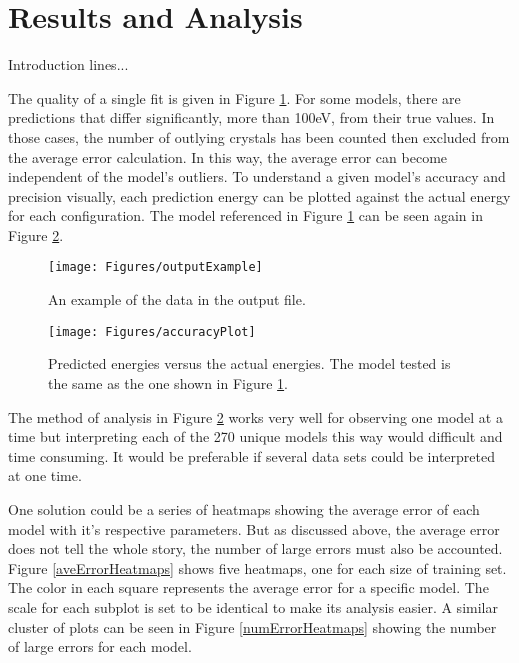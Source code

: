 \section{Results and Analysis}\label{Sect:results}
\par Introduction lines...
\par The quality of a single fit is given in Figure \ref{outputExample}. For some models, there are predictions that differ significantly, more than 100eV, from their true values. In those cases, the number of outlying crystals has been counted then excluded from the average error calculation. In this way, the average error can become independent of the model's outliers. To understand a given model's accuracy and precision visually, each prediction energy can be plotted against the actual energy for each configuration. The model referenced in Figure \ref{outputExample} can be seen again in Figure \ref{accuracyPlot}.

\begin{figure}[h]
\texttt{[image: Figures/outputExample]}
\caption{An example of the data in the output file. 
\label{outputExample}} 
\end{figure}

\begin{figure}[h]
\texttt{[image: Figures/accuracyPlot]}
\caption{Predicted energies versus the actual energies. The model tested is the same as the one shown in Figure \ref{outputExample}.
\label{accuracyPlot}} 
\end{figure}

\par The method of analysis in Figure \ref{accuracyPlot} works very well for observing one model at a time but interpreting each of the 270 unique models this way would difficult and time consuming. It would be preferable if several data sets could be interpreted at one time.
\par One solution could be a series of heatmaps showing the average error of each model with it's respective parameters. But as discussed above, the average error does not tell the whole story, the number of large errors must also be accounted. Figure \ref{aveErrorHeatmaps} shows five heatmaps, one for each size of training set. The color in each square represents the average error for a specific model. The scale for each subplot is set to be identical to make its analysis easier. A similar cluster of plots can be seen in Figure \ref{numErrorHeatmaps} showing the number of large errors for each model. 

